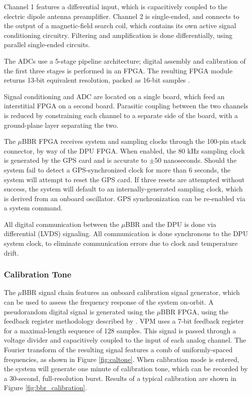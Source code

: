 Channel 1 features a differential input, which is capacitively coupled to the electric dipole antenna preamplifier. Channel 2 is single-ended, and connects to the output of a magnetic-field search coil, which contains its own active signal conditioning circuitry. Filtering and amplification is done differentially, using parallel single-ended circuits. 

The ADCs use a 5-stage pipeline architecture; digital assembly and calibration of the first three stages is performed in an FPGA. The resulting FPGA module returns 13-bit equivalent resolution, packed as 16-bit samples \citep{Wang2009}. 

Signal conditioning and ADC are located on a single board, which feed an interstitial FPGA on a second board. Parasitic coupling between the two channels is reduced by constraining each channel to a separate side of the board, with a ground-plane layer separating the two. 

The $\mu$BBR FPGA receives system and sampling clocks through the 100-pin stack connector, by way of the DPU FPGA. When enabled, the 80 kHz sampling clock is generated by the GPS card and is accurate to $\pm$50 nanoseconds. Should the system fail to detect a GPS-synchronized clock for more than 6 seconds, the system will attempt to reset the GPS card. If three resets are attempted without success, the system will default to an internally-generated sampling clock, which is derived from an onboard oscillator. GPS synchronization can be re-enabled via a system command.

All digital communication between the $\mu$BBR and the DPU is done via differential (LVDS) signaling. All communication is done synchronous to the DPU system clock, to eliminate communication errors due to clock and temperature drift.


 \subsubsection{Calibration Tone}
The $\mu$BBR signal chain features an onboard calibration signal generator, which can be used to assess the frequency response of the system on-orbit. A pseudorandom digital signal is generated using the $\mu$BBR FPGA, using the feedback register methodology described by \cite{Paschal2005}. VPM uses a 7-bit feedback register for a maximal-length sequence of 128 samples. This signal is passed through a voltage divider and capacitively coupled to the input of each analog channel. The Fourier transform of the resulting signal features a comb of uniformly-spaced frequencies, as shown in Figure \ref{fig:caltone}. When calibration mode is entered, the system will generate one minute of calibration tone, which can be recorded by a 30-second, full-resolution burst. Results of a typical calibration are shown in Figure \ref{fig:bbr_calibration}.

